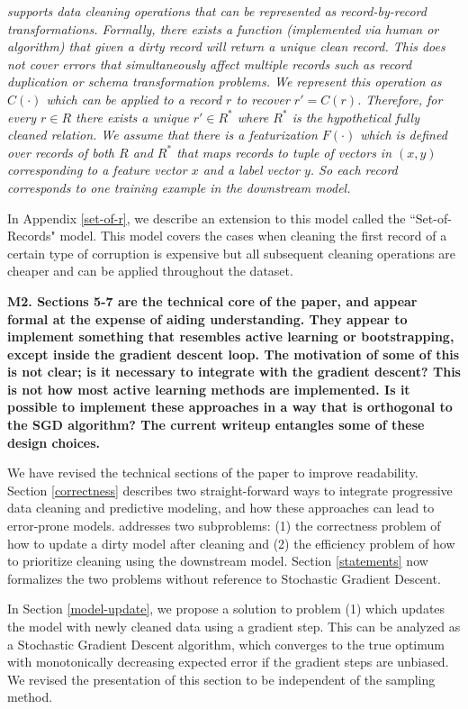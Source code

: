 \emph{\sys supports data cleaning operations that can be represented as record-by-record transformations.
Formally, there exists a function (implemented via human or algorithm) that given a dirty record will return a unique clean record.
This does not cover errors that simultaneously affect multiple records such as record duplication or schema transformation problems.
We represent this operation as $C(\cdot)$ which can be applied to a record $r$ to recover $r' = C(r)$.
Therefore, for every $r \in R$ there exists a unique $r' \in R^*$ where $R^*$ is the hypothetical fully cleaned relation.
We assume that there is a featurization $F(\cdot)$ which is defined over records of both $R$ and $R^*$ that maps records to tuple of vectors in $(x, y)$ corresponding to a feature vector $x$ and a label vector $y$.
So each record corresponds to one training example in the downstream model.}

\vspace{0.5em}

In Appendix \ref{set-of-r}, we describe an extension to this model called the ``Set-of-Records" model.
This model covers the cases when cleaning the first record of a certain type of corruption is expensive but all subsequent cleaning operations are cheaper and can be applied throughout the dataset.

\noindent\textbf{M2. Sections 5-7 are the technical core of the paper, and appear formal at the expense of aiding understanding. They appear to implement something that resembles active learning or bootstrapping, except inside the gradient descent loop. The motivation of some of this is not clear; is it necessary to integrate with the gradient descent? This is not how most active learning methods are implemented. Is it possible to implement these approaches in a way that is orthogonal to the SGD algorithm? The current writeup entangles some of these design choices.} 

We have revised the technical sections of the paper to improve readability.
Section \ref{correctness} describes two straight-forward ways to integrate progressive data cleaning and predictive modeling, and how these approaches can lead to error-prone models.
\sys addresses two subproblems: (1) the correctness problem of how to update a dirty model after cleaning and (2) the efficiency problem of how to prioritize cleaning using the downstream model. 
Section \ref{statements} now formalizes the two problems without reference to Stochastic Gradient Descent.

In Section \ref{model-update}, we propose a solution to problem (1) which updates the model with newly cleaned data using a gradient step.
This can be analyzed as a Stochastic Gradient Descent algorithm, which converges to the true optimum with monotonically decreasing expected error if the gradient steps are unbiased.
We revised the presentation of this section to be independent of the sampling method.

